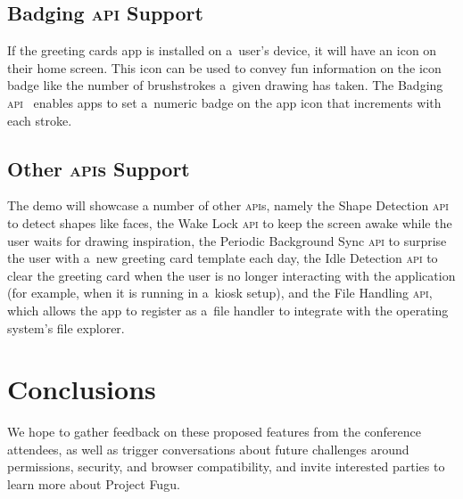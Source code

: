 \documentclass[sigconf]{acmart}
\begin{document}
\subsection{Badging \textsc{api} Support}

If the greeting cards app is installed on a~user's device,
it will have an icon on their home screen.
This icon can be used to convey fun information on the icon badge
like the number of brushstrokes a~given drawing has taken.
The Badging \textsc{api}~\cite{giuca19} enables apps to set a~numeric badge on the app icon
that increments with each stroke.

\subsection{Other \textsc{api}s Support}

The demo will showcase a number of other \textsc{api}s, namely the
Shape Detection \textsc{api} to detect shapes like faces,
the Wake Lock  \textsc{api} to keep the screen awake
while the user waits for drawing inspiration, 
the Periodic Background Sync  \textsc{api} to surprise the user
with a~new greeting card template each day,
the Idle Detection \textsc{api} to clear the greeting card
when the user is no longer interacting with the application
(for example, when it is running in a~kiosk setup),
and the File Handling \textsc{api}, which allows the app
to register as a~file handler to integrate with the operating system's file explorer.

\section{Conclusions}

We hope to gather feedback on these proposed features from the conference attendees,
as well as trigger conversations about future challenges around
permissions, security, and browser compatibility,
and invite interested parties to learn more about Project Fugu.



\end{document}
